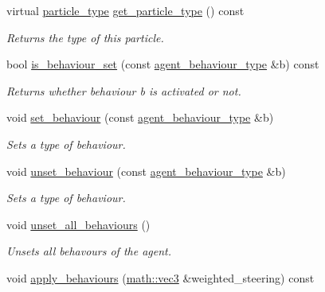 \begin{DoxyCompactItemize}
virtual \hyperlink{namespacephysim_1_1particles_a068e6cda6626fbd381c07a9835425b08}{particle\+\_\+type} \hyperlink{classphysim_1_1particles_1_1agent__particle_aa053f50646658dcb4676a1ffd688a8ce}{get\+\_\+particle\+\_\+type} () const
\begin{DoxyCompactList}\small\item\em Returns the type of this particle. \end{DoxyCompactList}\item 
\mbox{\label{classphysim_1_1particles_1_1agent__particle_a9e8fe0f0491005226f77bdb829132be6}} 
bool \hyperlink{classphysim_1_1particles_1_1agent__particle_a9e8fe0f0491005226f77bdb829132be6}{is\+\_\+behaviour\+\_\+set} (const \hyperlink{namespacephysim_1_1particles_a033757595f7862a0fc8a389d79bf9c88}{agent\+\_\+behaviour\+\_\+type} \&b) const
\begin{DoxyCompactList}\small\item\em Returns whether behaviour {\itshape b} is activated or not. \end{DoxyCompactList}\item 
void \hyperlink{classphysim_1_1particles_1_1agent__particle_a5eeac79c256570806270b4de1907396f}{set\+\_\+behaviour} (const \hyperlink{namespacephysim_1_1particles_a033757595f7862a0fc8a389d79bf9c88}{agent\+\_\+behaviour\+\_\+type} \&b)
\begin{DoxyCompactList}\small\item\em Sets a type of behaviour. \end{DoxyCompactList}\item 
void \hyperlink{classphysim_1_1particles_1_1agent__particle_a903f5a9d1c34eed73dd5286e55e41b3d}{unset\+\_\+behaviour} (const \hyperlink{namespacephysim_1_1particles_a033757595f7862a0fc8a389d79bf9c88}{agent\+\_\+behaviour\+\_\+type} \&b)
\begin{DoxyCompactList}\small\item\em Sets a type of behaviour. \end{DoxyCompactList}\item 
void \hyperlink{classphysim_1_1particles_1_1agent__particle_a1707492909bba01164bf38186a68bcb7}{unset\+\_\+all\+\_\+behaviours} ()
\begin{DoxyCompactList}\small\item\em Unsets all behavours of the agent. \end{DoxyCompactList}\item 
void \hyperlink{classphysim_1_1particles_1_1agent__particle_a8c43ad56e0b73e6795a287fb945da092}{apply\+\_\+behaviours} (\hyperlink{structphysim_1_1math_1_1vec3}{math\+::vec3} \&weighted\+\_\+steering) const

\end{DoxyCompactItemize}
